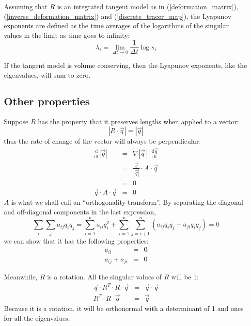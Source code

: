 \documentclass[12pt]{article}
\begin{document}
Assuming that $R$ is an integrated tangent model as in 
(\ref{deformation_matrix}), (\ref{inverse_deformation_matrix})
and (\ref{discrete_tracer_map}), 
the Lyapunov exponents are defined as the time averages of the logarithms
of the singular values in the limit as time goes to infinity:
\begin{equation}
\lambda_i=\lim_{\Delta t \rightarrow 0} \frac{1}{\Delta t} \log s_i
\end{equation}

If the tangent model is volume conserving, then the Lyapunov exponents, like
the eigenvalues, will sum to zero.

\subsection{Other properties}

Suppose $R$ has the property that it preserves lengths when applied to
a vector:
\begin{equation}
|R\cdot \vec q| = |\vec q|
\end{equation}
thus the rate of change of the vector will always be perpendicular:
\begin{eqnarray}
\frac{\mathrm d}{\mathrm d t}|\vec q| & = & 
	\nabla |\vec q| \cdot \frac{\mathrm d \vec q}{\mathrm d t} \\
	&=& \frac{\vec q}{|\vec q|} \cdot A \cdot \vec q \\
	&=& 0 \\
	\vec q \cdot A \cdot \vec q & = & 0 
\end{eqnarray}
$A$ is what we shall call an ``orthogonality transform''.
By separating the diagonal and off-diagonal components in the last expression,
\begin{equation}
\sum_i \sum_j a_{ij} q_i q_j = \sum_{i=1}^n a_{ii}q_i^2 + \sum_{i=1}^n \sum_{j=i+1}^n (a_{ij} q_i q_j + a_{ji} q_i q_j) = 0
\end{equation}
we can show that it has the following
properties:
\begin{eqnarray}
a_{ii} & = & 0 \\
a_{ij}+a_{ji} & = & 0
\end{eqnarray}

Meanwhile, $R$ is a rotation.  All the singular values of $R$ will be 1:
\begin{eqnarray}
\vec q \cdot R^T \cdot R \cdot \vec q & = & \vec q \cdot \vec q\\
R^T \cdot R \cdot \vec q & = & \vec q
\end{eqnarray}
Because it is a rotation, it will be orthonormal with a determinant of 1
and ones for all the eigenvalues.
\end{document}
